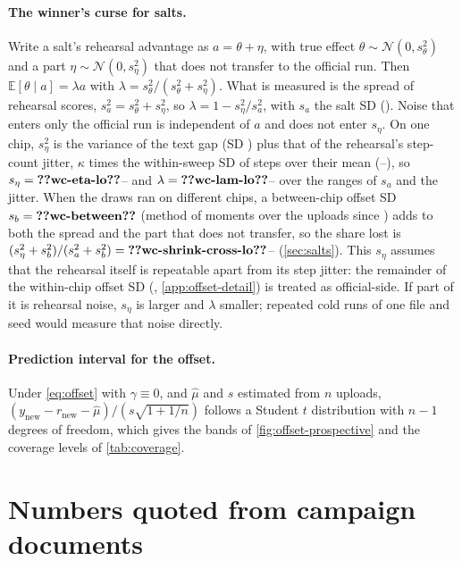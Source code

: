 \paragraph{The winner's curse for salts.} Write a salt's rehearsal advantage as $a = \theta + \eta$, with true effect
$\theta \sim \mathcal{N}(0, s_\theta^2)$ and a part $\eta\sim\mathcal{N}(0, s_\eta^2)$ that does not transfer to the
official run. Then $\mathbb{E}[\theta \mid a] = \lambda a$ with $\lambda = s_\theta^2/(s_\theta^2 + s_\eta^2)$. What
is measured is the spread of rehearsal scores, $s_a^2 = s_\theta^2 + s_\eta^2$, so $\lambda = 1 - s_\eta^2/s_a^2$,
with $s_a$ the salt SD (\docnum{}). Noise that enters only the official run is independent of $a$ and
does not enter $s_\eta$. On one chip, $s_\eta^2$ is the variance of the text gap (SD ) plus that of the
rehearsal's step-count jitter, $\kappa$ times the within-sweep SD of steps over their mean
(--), so $s_\eta=\val{wc-eta-lo}$-- and
$\lambda=\val{wc-lam-lo}$-- over the ranges of $s_a$ and the jitter. When the draws ran on different
chips, a between-chip offset SD $s_b=\val{wc-between}$ (method of moments over the uploads since ) adds to
both the spread and the part that does not transfer, so the share lost is
$(s_\eta^2+s_b^2)/(s_a^2+s_b^2)=\val{wc-shrink-cross-lo}$-- (\cref{sec:salts}). This
$s_\eta$ assumes that the rehearsal itself is repeatable apart from its step jitter: the remainder of the within-chip
offset SD (, \cref{app:offset-detail}) is treated as official-side. If part of it is rehearsal
noise, $s_\eta$ is larger and $\lambda$ smaller; repeated cold runs of one file and seed would measure that
noise directly.

\paragraph{Prediction interval for the offset.} Under \cref{eq:offset} with $\gamma\equiv0$, and $\hat\mu$ and $s$
estimated from $n$ uploads, $(y_{\text{new}} - r_{\text{new}} - \hat\mu)/(s\sqrt{1+1/n})$ follows a Student $t$
distribution with $n-1$ degrees of freedom, which gives the bands of \cref{fig:offset-prospective} and the coverage
levels of \cref{tab:coverage}.

\section{Numbers quoted from campaign documents}
\label{app:docfacts}

